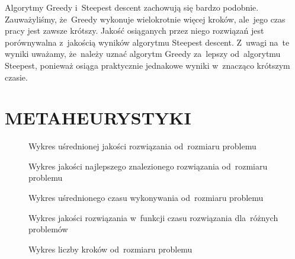 \documentclass[a4paper,10pt]{article}
\begin{document}
Algorytmy Greedy i~Steepest descent zachowują się bardzo podobnie.
Zauważyliśmy, że~Greedy wykonuje wielokrotnie więcej kroków, ale~jego czas pracy jest zawsze krótszy.
Jakość osiąganych przez niego rozwiązań jest porównywalna z~jakością wyników algorytmu Steepest descent.
Z~uwagi na~te wyniki uważamy, że~należy uznać algorytm Greedy za~lepszy od~algorytmu Steepest, ponieważ osiąga praktycznie jednakowe
wyniki w~znacząco krótszym czasie.

\section{METAHEURYSTYKI}

\begin{figure}[!htpb]
\begin{center}

\caption{Wykres uśrednionej jakości rozwiązania od~rozmiaru problemu}
\label{fig:qualityvssizemeanMETA}
\end{center}
\end{figure}

\begin{figure}[!htpb]
\begin{center}

\caption{Wykres jakości najlepszego znalezionego rozwiązania od~rozmiaru problemu}
\label{fig:qualityvssizemaxMETA}
\end{center}
\end{figure}

\begin{figure}[!htpb]
\begin{center}

\caption{Wykres uśrednionego czasu wykonywania od~rozmiaru problemu}
\label{fig:timesizeMETA}
\end{center}
\end{figure}

\begin{figure}
\begin{center}

\caption{Wykres jakości rozwiązania w~funkcji czasu rozwiązania dla~różnych problemów}
\label{fig:qualitytimefullMETA}
\end{center}
\end{figure}

\begin{figure}[!htpb]
\begin{center}

\caption{Wykres liczby kroków od~rozmiaru problemu}
\label{fig:stepssizeMETA}
\end{center}
\end{figure}
\end{document}
